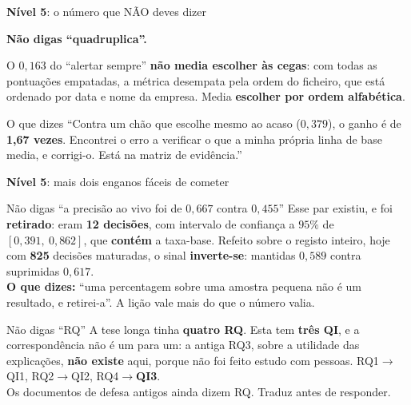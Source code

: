\documentclass[aspectratio=169]{beamer}
\newcommand{\key}[1]{\textbf{\textcolor{blue!55!black}{#1}}}
\begin{document}
\begin{frame}{\key{Nível 5}: o número que NÃO deves dizer}
\begin{center}
\Large \textbf{Não digas ``quadruplica''.}
\end{center}
\vspace{4mm}
O $0{,}163$ do ``alertar sempre'' \textbf{não media escolher às cegas}: com todas as pontuações
empatadas, a métrica desempata pela ordem do ficheiro, que está ordenado por data e nome da
empresa. Media \textbf{escolher por ordem alfabética}.
\vspace{3mm}
\begin{block}{O que dizes}
``Contra um chão que escolhe mesmo ao acaso ($0{,}379$), o ganho é de \textbf{1{,}67 vezes}. Encontrei
o erro a verificar o que a minha própria linha de base media, e corrigi-o. Está na matriz de
evidência.''
\end{block}
\end{frame}

\begin{frame}{\key{Nível 5}: mais dois enganos fáceis de cometer}
\begin{block}{Não digas ``a precisão ao vivo foi de $0{,}667$ contra $0{,}455$''}
Esse par existiu, e foi \textbf{retirado}: eram \textbf{12 decisões}, com intervalo de
confiança a $95\%$ de $[0{,}391,\ 0{,}862]$, que \textbf{contém} a taxa-base. Refeito sobre o
registo inteiro, hoje com \textbf{825} decisões maturadas, o sinal \textbf{inverte-se}:
mantidas $0{,}589$ contra suprimidas $0{,}617$.\\[2mm]
\textbf{O que dizes:} ``uma percentagem sobre uma amostra pequena não é um resultado, e
retirei-a''. A lição vale mais do que o número valia.
\end{block}
\vspace{2mm}
\begin{block}{Não digas ``RQ''}
A tese longa tinha \textbf{quatro RQ}. Esta tem \textbf{três QI}, e a correspondência não é um
para um: a antiga RQ3, sobre a utilidade das explicações, \textbf{não existe} aqui, porque não
foi feito estudo com pessoas. RQ1$\to$QI1, RQ2$\to$QI2, RQ4$\to$\textbf{QI3}.\\[2mm]
Os documentos de defesa antigos ainda dizem RQ. Traduz antes de responder.
\end{block}
\end{frame}
\end{document}

